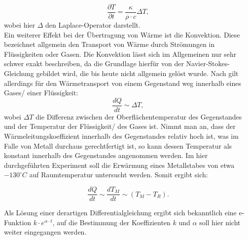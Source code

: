 \begin{equation}
\frac{\partial T}{\partial t} = \frac{\kappa}{\rho \cdot c} \Delta T, 
\end{equation}
wobei hier $\Delta$ den Laplace-Operator darstellt. 
\\
Ein weiterer Effekt bei der Übertragung von Wärme ist die Konvektion. Diese bezeichnet allgemein den Transport von Wärme durch Strömungen in Flüssigkeiten oder Gasen. Die Konvektion lässt sich im Allgemeinen nur sehr schwer exakt beschreiben, da die Grundlage hierfür von der Navier-Stokes-Gleichung gebildet wird, die bis heute nicht allgemein gelöst wurde. Nach \cite{pratikumwaerme} gilt allerdings für den Wärmetransport von einem Gegenstand weg innerhalb eines Gases/ einer Flüssigkeit: 
\begin{equation}
\frac{dQ}{dt} \sim \Delta T,
\end{equation}
wobei $\Delta T$ die Differenz zwischen der Oberflächentemperatur des Gegenstandes und der Temperatur der Flüssigkeit/ des Gases ist. 
Nimmt man an, dass der Wärmeleitungskoeffizient innerhalb des Gegenstandes relativ hoch ist, was im Falle von Metall durchaus gerechtfertigt ist, so kann dessen Temperatur als konstant innerhalb des Gegenstandes angenommen werden. 
Im hier durchgeführten Experiment soll die Erwärmung eines Metallstabes von etwa $ -130 ^{\circ} C $ auf Raumtemperatur untersucht werden. Somit ergibt sich: 

\begin{equation}
\frac{dQ}{dt} \sim  \frac{dT_M}{dt} \sim (T_{M} - T_{R}). 
\end{equation}

Als Lösung einer derartigen Differentialgleichung ergibt sich bekanntlich eine e-Funktion $k \cdot e^{\alpha \cdot t}$, auf die Bestimmung der Koeffizienten $k$ und $\alpha$ soll hier nicht weiter eingegangen werden. 
